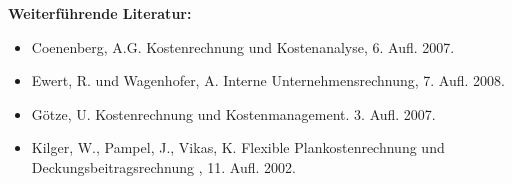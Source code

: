 \begin{course}
\begin{literature}\textbf{Weiterführende Literatur:}

 \begin{itemize}\item Coenenberg, A.G. Kostenrechnung und Kostenanalyse, 6. Aufl. 2007.  \item Ewert, R. und Wagenhofer, A. Interne Unternehmensrechnung, 7. Aufl. 2008.  \item Götze, U. Kostenrechnung und Kostenmanagement. 3. Aufl. 2007.  \item Kilger, W., Pampel, J., Vikas, K. Flexible Plankostenrechnung und Deckungsbeitragsrechnung , 11. Aufl. 2002.  \end{itemize}\end{literature}



\end{course}